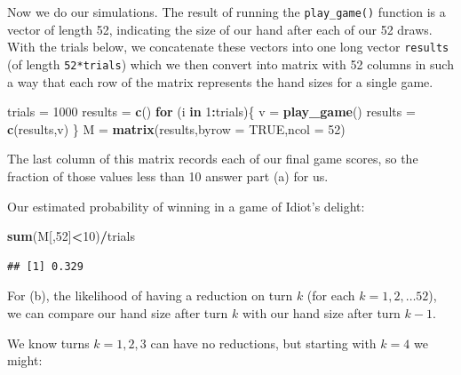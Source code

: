 \documentclass[
]{book}
\newenvironment{Shaded}{\begin{snugshade}}{\end{snugshade}}
\newcommand{\AttributeTok}[1]{\textcolor[rgb]{0.13,0.29,0.53}{#1}}
\newcommand{\ConstantTok}[1]{\textcolor[rgb]{0.56,0.35,0.01}{#1}}
\newcommand{\ControlFlowTok}[1]{\textcolor[rgb]{0.13,0.29,0.53}{\textbf{#1}}}
\newcommand{\DecValTok}[1]{\textcolor[rgb]{0.00,0.00,0.81}{#1}}
\newcommand{\FunctionTok}[1]{\textcolor[rgb]{0.13,0.29,0.53}{\textbf{#1}}}
\newcommand{\NormalTok}[1]{#1}
\newcommand{\OtherTok}[1]{\textcolor[rgb]{0.56,0.35,0.01}{#1}}
\newcommand{\SpecialCharTok}[1]{\textcolor[rgb]{0.81,0.36,0.00}{\textbf{#1}}}
\theoremstyle{definition}
\theoremstyle{definition}
\theoremstyle{definition}
\theoremstyle{definition}
\theoremstyle{remark}
\begin{document}
Now we do our simulations. The result of running the \texttt{play\_game()} function is a vector of length 52, indicating the size of our hand after each of our 52 draws. With the trials below, we concatenate these vectors into one long vector \texttt{results} (of length \texttt{52*trials}) which we then convert into matrix with 52 columns in such a way that each row of the matrix represents the hand sizes for a single game.

\begin{Shaded}
\begin{Highlighting}[]
\NormalTok{trials }\OtherTok{=} \DecValTok{1000}
\NormalTok{results }\OtherTok{=} \FunctionTok{c}\NormalTok{()}
\ControlFlowTok{for}\NormalTok{ (i }\ControlFlowTok{in} \DecValTok{1}\SpecialCharTok{:}\NormalTok{trials)\{}
\NormalTok{  v }\OtherTok{=} \FunctionTok{play\_game}\NormalTok{() }
\NormalTok{  results }\OtherTok{=} \FunctionTok{c}\NormalTok{(results,v)}
\NormalTok{\}}
\NormalTok{M }\OtherTok{=} \FunctionTok{matrix}\NormalTok{(results,}\AttributeTok{byrow =} \ConstantTok{TRUE}\NormalTok{,}\AttributeTok{ncol =} \DecValTok{52}\NormalTok{)}
\end{Highlighting}
\end{Shaded}

The last column of this matrix records each of our final game scores, so the fraction of those values less than 10 answer part (a) for us.

Our estimated probability of winning in a game of Idiot's delight:

\begin{Shaded}
\begin{Highlighting}[]
\FunctionTok{sum}\NormalTok{(M[,}\DecValTok{52}\NormalTok{]}\SpecialCharTok{\textless{}}\DecValTok{10}\NormalTok{)}\SpecialCharTok{/}\NormalTok{trials}
\end{Highlighting}
\end{Shaded}

\begin{verbatim}
## [1] 0.329
\end{verbatim}

For (b), the likelihood of having a reduction on turn \(k\) (for each \(k = 1,2,\ldots 52\)), we can compare our hand size after turn \(k\) with our hand size after turn \(k-1\).

We know turns \(k = 1, 2, 3\) can have no reductions, but starting with \(k = 4\) we might:
\end{document}
